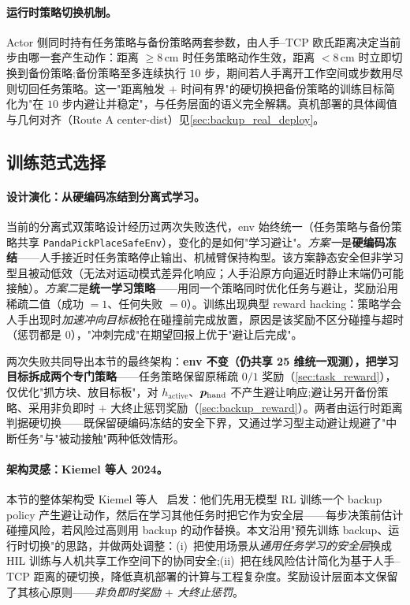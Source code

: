 \paragraph{运行时策略切换机制。}Actor 侧同时持有任务策略与备份策略两套参数，由人手--TCP 欧氏距离决定当前步由哪一套产生动作：距离 $\geq 8\,\text{cm}$ 时任务策略动作生效，距离 $< 8\,\text{cm}$ 时立即切换到备份策略;备份策略至多连续执行 $10$ 步，期间若人手离开工作空间或步数用尽则切回任务策略。这一"距离触发 $+$ 时间有界"的硬切换把备份策略的训练目标简化为"在 $10$ 步内避让并稳定"，与任务层面的语义完全解耦。真机部署的具体阈值与几何对齐（Route A center-dist）见\cref{sec:backup_real_deploy}。

\subsection{训练范式选择}\label{sec:backup_paradigm}

\paragraph{设计演化：从硬编码冻结到分离式学习。}当前的分离式双策略设计经历过两次失败迭代，env 始终统一（任务策略与备份策略共享 \texttt{PandaPickPlaceSafeEnv}），变化的是如何"学习避让"。\emph{方案一}是\textbf{硬编码冻结}——人手接近时任务策略停止输出、机械臂保持构型。该方案静态安全但非学习型且被动低效（无法对运动模式差异化响应；人手沿原方向逼近时静止末端仍可能接触）。\emph{方案二}是\textbf{统一学习策略}——用同一个策略同时优化任务与避让，奖励沿用稀疏二值（成功 $= 1$、任何失败 $= 0$）。训练出现典型 reward hacking：策略学会人手出现时\emph{加速冲向目标板}抢在碰撞前完成放置，原因是该奖励不区分碰撞与超时（惩罚都是 0），"冲刺完成"在期望回报上优于"避让后完成"。

两次失败共同导出本节的最终架构：\textbf{env 不变（仍共享 25 维统一观测），把学习目标拆成两个专门策略}——任务策略保留原稀疏 $0/1$ 奖励（\cref{sec:task_reward}），仅优化"抓方块、放目标板"，对 $h_\text{active}$、$\bm{p}_\text{hand}$ 不产生避让响应;避让另开备份策略、采用非负即时 $+$ 大终止惩罚奖励（\cref{sec:backup_reward}）。两者由运行时距离判据硬切换——既保留硬编码冻结的安全下界，又通过学习型主动避让规避了"中断任务"与"被动接触"两种低效情形。

\paragraph{架构灵感：Kiemel 等人 2024。}本节的整体架构受 Kiemel 等人~\cite{kiemel2024safe} 启发：他们先用无模型 RL 训练一个 backup policy 产生避让动作，然后在学习其他任务时把它作为安全层——每步决策前估计碰撞风险，若风险过高则用 backup 的动作替换。本文沿用"预先训练 backup、运行时切换"的思路，并做两处调整：(i)~把使用场景从\emph{通用任务学习的安全层}换成 HIL 训练与人机共享工作空间下的协同安全;(ii)~把在线风险估计简化为基于人手--TCP 距离的硬切换，降低真机部署的计算与工程复杂度。奖励设计层面本文保留了其核心原则——\emph{非负即时奖励 $+$ 大终止惩罚}。

